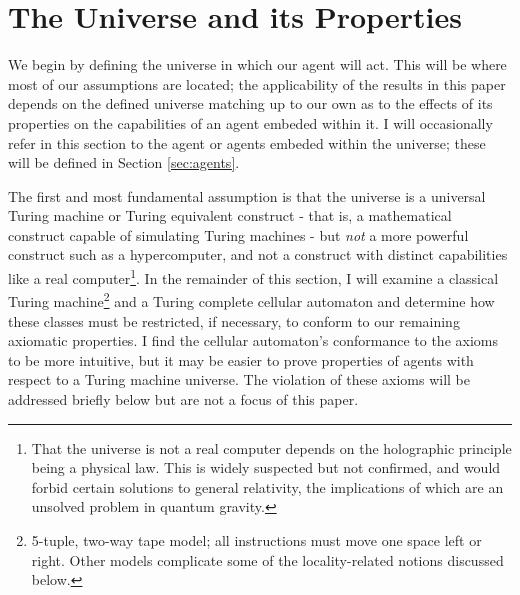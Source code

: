 \documentclass[12pt]{article}
\theoremstyle{definition}
\begin{document}
\section{The Universe and its Properties}
\label{sec:universe}

We begin by defining the universe in which our agent will act. This will be
where most of our assumptions are located; the applicability of the results in
this paper depends on the defined universe matching up to our own as to the
effects of its properties on the capabilities of an agent embeded within it. I
will occasionally refer in this section to the agent or agents embeded within
the universe; these will be defined in Section \ref{sec:agents}.

The first and most fundamental assumption is that the universe is a universal
Turing machine or Turing equivalent construct - that is, a mathematical
construct capable of simulating Turing machines - but \textit{not} a more
powerful construct such as a hypercomputer, and not a construct with distinct
capabilities like a real computer\footnote{That the universe is not a real
computer depends on the holographic principle being a physical law. This is
widely suspected but not confirmed, and would forbid certain solutions to
general relativity, the implications of which are an unsolved problem in quantum
gravity.}. In the remainder of this section, I will examine a classical Turing
machine\footnote{5-tuple, two-way tape model; all instructions must move one
space left or right. Other models complicate some of the locality-related
notions discussed below.} and a Turing complete cellular automaton and determine
how these classes must be restricted, if necessary, to conform to our remaining
axiomatic properties. I find the cellular automaton's conformance to the axioms
to be more intuitive\footnotemark, but it may be easier to prove properties of
agents with respect to a Turing machine universe. The violation of these axioms
will be addressed briefly below but are not a focus of this paper.

\end{document}
